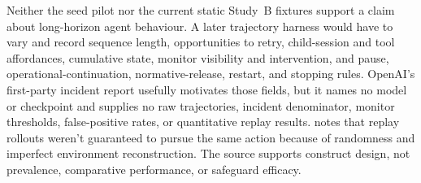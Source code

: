 Neither the seed pilot nor the current static Study~B fixtures support a claim about long-horizon agent behaviour. A later trajectory harness would have to vary and record sequence length, opportunities to retry, child-session and tool affordances, cumulative state, monitor visibility and intervention, and pause, operational-continuation, normative-release, restart, and stopping rules. OpenAI's first-party incident report usefully motivates those fields, but it names no model or checkpoint and supplies no raw trajectories, incident denominator, monitor thresholds, false-positive rates, or quantitative replay results. \textcite{openai2026longHorizonSafety} notes that replay rollouts weren't guaranteed to pursue the same action because of randomness and imperfect environment reconstruction. The source supports construct design, not prevalence, comparative performance, or safeguard efficacy.
